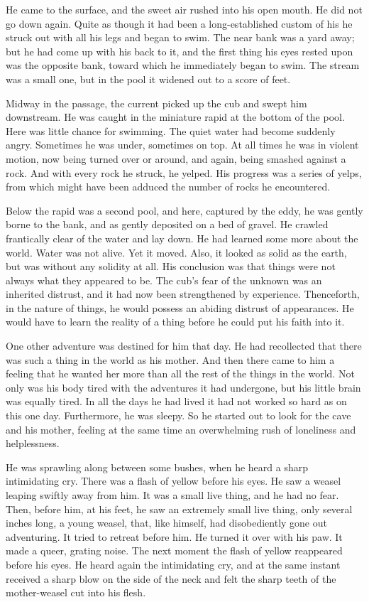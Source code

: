 \documentclass[10pt]{book}
\begin{document}
He came to the surface, and the sweet air rushed into his open mouth.
He did not go down again. Quite as though it had been a
long-established custom of his he struck out with all his legs and
began to swim. The near bank was a yard away; but he had come up with
his back to it, and the first thing his eyes rested upon was the
opposite bank, toward which he immediately began to swim. The stream
was a small one, but in the pool it widened out to a score of feet.

Midway in the passage, the current picked up the cub and swept him
downstream. He was caught in the miniature rapid at the bottom of the
pool. Here was little chance for swimming. The quiet water had become
suddenly angry. Sometimes he was under, sometimes on top. At all times
he was in violent motion, now being turned over or around, and again,
being smashed against a rock. And with every rock he struck, he yelped.
His progress was a series of yelps, from which might have been adduced
the number of rocks he encountered.

Below the rapid was a second pool, and here, captured by the eddy, he
was gently borne to the bank, and as gently deposited on a bed of
gravel. He crawled frantically clear of the water and lay down. He had
learned some more about the world. Water was not alive. Yet it moved.
Also, it looked as solid as the earth, but was without any solidity at
all. His conclusion was that things were not always what they appeared
to be. The cub’s fear of the unknown was an inherited distrust, and it
had now been strengthened by experience. Thenceforth, in the nature of
things, he would possess an abiding distrust of appearances. He would
have to learn the reality of a thing before he could put his faith into
it.

One other adventure was destined for him that day. He had recollected
that there was such a thing in the world as his mother. And then there
came to him a feeling that he wanted her more than all the rest of the
things in the world. Not only was his body tired with the adventures it
had undergone, but his little brain was equally tired. In all the days
he had lived it had not worked so hard as on this one day. Furthermore,
he was sleepy. So he started out to look for the cave and his mother,
feeling at the same time an overwhelming rush of loneliness and
helplessness.

He was sprawling along between some bushes, when he heard a sharp
intimidating cry. There was a flash of yellow before his eyes. He saw a
weasel leaping swiftly away from him. It was a small live thing, and he
had no fear. Then, before him, at his feet, he saw an extremely small
live thing, only several inches long, a young weasel, that, like
himself, had disobediently gone out adventuring. It tried to retreat
before him. He turned it over with his paw. It made a queer, grating
noise. The next moment the flash of yellow reappeared before his eyes.
He heard again the intimidating cry, and at the same instant received a
sharp blow on the side of the neck and felt the sharp teeth of the
mother-weasel cut into his flesh.
\end{document}
